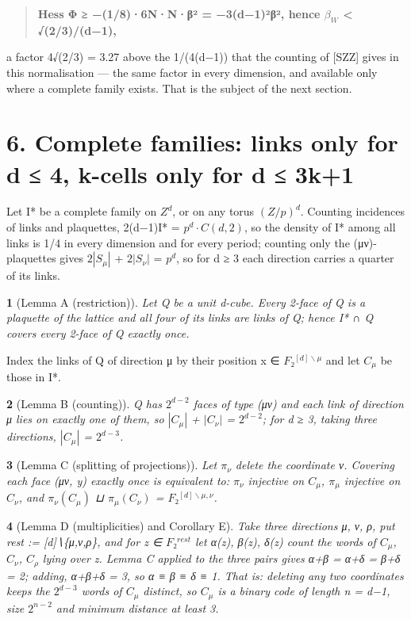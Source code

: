 \documentclass[11pt,a4paper]{article}
\theoremstyle{named}
\newtheorem*{namedthm}{}
\begin{document}
\begin{quote}
\textbf{Hess Φ ≥ −(1/8)·6N·N·β² = −3(d−1)²β²,  hence $β_W$ \textless{} √(2/3)/(d−1),}
\end{quote}
a factor 4√(2/3) = 3.27 above the 1/(4(d−1)) that the counting of [SZZ] gives in this normalisation — the same factor in every dimension, and available only where a complete family exists. That is the subject of the next section.

\section*{6. Complete families: links only for d ≤ 4, k-cells only for d ≤ 3k+1}
Let I* be a complete family on $Z^d$, or on any torus $(Z/p)^d$. Counting incidences of links and plaquettes, 2(d−1)\textbar{}I*\textbar{} = $p^d·C(d,2)$, so the density of I* among all links is 1/4 in every dimension and for every period; counting only the (μν)-plaquettes gives $2|S_{μ}|$ + $2|S_{ν}|$ = $p^d$, so for d ≥ 3 each direction carries a quarter of its links.

\begin{namedthm}[Lemma A (restriction)]
Let Q be a unit d-cube. Every 2-face of Q is a plaquette of the lattice and all four of its links are links of Q; hence I* ∩ Q covers every 2-face of Q exactly once.
\end{namedthm}

Index the links of Q of direction μ by their position x ∈ $F₂^{[d]∖μ}$ and let $C_{μ}$ be those in I*.

\begin{namedthm}[Lemma B (counting)]
Q has $2^{d−2}$ faces of type (μν) and each link of direction μ lies on exactly one of them, so $|C_{μ}|$ + $|C_{ν}|$ = $2^{d−2}$; for d ≥ 3, taking three directions, $|C_{μ}|$ = $2^{d−3}$.
\end{namedthm}

\begin{namedthm}[Lemma C (splitting of projections)]
Let $π_{ν}$ delete the coordinate ν. Covering each face (μν, y) exactly once is equivalent to: $π_{ν}$ injective on $C_{μ}$, $π_{μ}$ injective on $C_{ν}$, and $π_{ν}(C_{μ})$ ⊔ $π_{μ}(C_{ν})$ = $F₂^{[d]∖{μ,ν}}$.
\end{namedthm}

\begin{namedthm}[Lemma D (multiplicities) and Corollary E]
Take three directions μ, ν, ρ, put rest := [d]∖\{μ,ν,ρ\}, and for z ∈ $F₂^{rest}$ let α(z), β(z), δ(z) count the words of $C_{μ}$, $C_{ν}$, $C_{ρ}$ lying over z. Lemma C applied to the three pairs gives α+β = α+δ = β+δ = 2; adding, α+β+δ = 3, so α ≡ β ≡ δ ≡ 1. That is: deleting any two coordinates keeps the $2^{d−3}$ words of $C_{μ}$ distinct, so $C_{μ}$ is a binary code of length n = d−1, size $2^{n−2}$ and minimum distance at least 3.
\end{namedthm}
\end{document}

